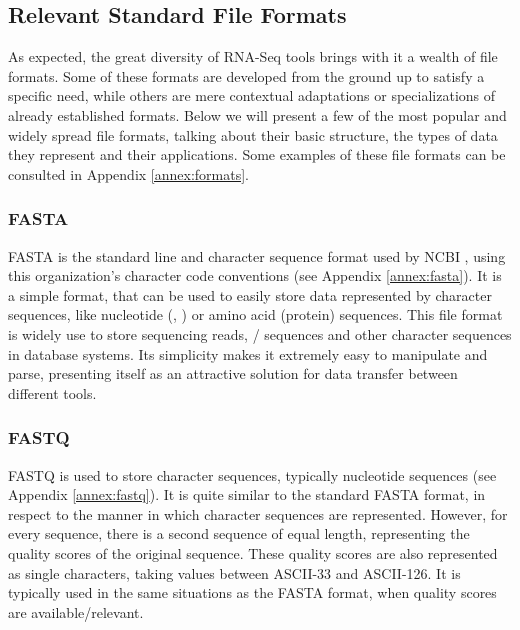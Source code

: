 \subsection{Relevant Standard File Formats}\label{sec:formats}


As expected, the great diversity of RNA-Seq tools brings with it a wealth of
file formats. Some of these formats are developed from the ground up to satisfy
a specific need, while others are mere contextual adaptations or specializations
of already established formats. Below we will present a few of the most popular
and widely spread file formats, talking about their basic structure, the types
of data they represent and their applications. Some examples of these file
formats can be consulted in Appendix \ref{annex:formats}.

\subsubsection*{FASTA}

FASTA is the standard line and character sequence format used by NCBI
\cite{ncbi:fasta}, using this organization's character code conventions (see
Appendix \ref{annex:fasta}). It is a simple format, that can be used to easily
store data represented by character sequences, like nucleotide (\dna, \rna) or
amino acid (protein) sequences. This file format is widely use to store
sequencing reads, \dna/\rna{} sequences and other character sequences in
database systems. Its simplicity makes it extremely easy to manipulate and
parse, presenting itself as an attractive solution for data transfer between
different tools.

\subsubsection*{FASTQ}

FASTQ is used to store character sequences, typically nucleotide sequences
\cite{Cock2010} (see Appendix \ref{annex:fastq}). It is quite similar to the
standard FASTA format, in respect to the manner in which character sequences are
represented. However, for every sequence, there is a second sequence of equal
length, representing the quality scores of the original sequence. These quality
scores are also represented as single characters, taking values between ASCII-33
and ASCII-126. It is typically used in the same situations as the FASTA format,
when quality scores are available/relevant.

